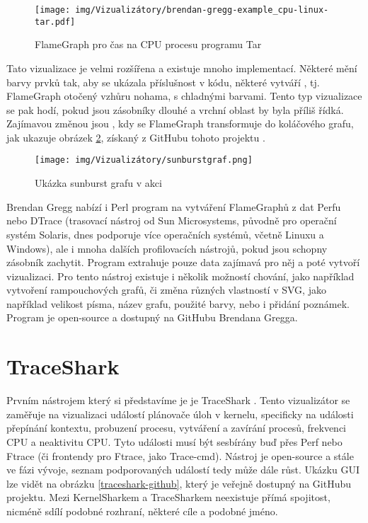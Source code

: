 \begin{figure}[p]\centering
    \texttt{[image: img/Vizualizátory/brendan-gregg-example\_cpu-linux-tar.pdf]}
    \caption{FlameGraph pro čas na CPU procesu programu Tar}
    \label{bg-flamegraf}
\end{figure}

Tato vizualizace je velmi rozšířena a existuje mnoho implementací. Některé mění barvy prvků tak, aby se ukázala příslušnost v kódu, některé vytváří , tj. FlameGraph otočený vzhůru nohama, s chladnými barvami. Tento typ vizualizace se pak hodí, pokud jsou zásobníky dlouhé a vrchní oblast by byla příliš řídká. Zajímavou změnou jsou , kdy se FlameGraph transformuje do koláčového grafu, jak ukazuje obrázek \ref{sunburstgraf}, získaný z GitHubu tohoto projektu \cite{SunburstGraphs}.

\begin{figure}[p]\centering
    \texttt{[image: img/Vizualizátory/sunburstgraf.png]}
    \caption{Ukázka sunburst grafu v akci}
    \label{sunburstgraf}
\end{figure}

Brendan Gregg nabízí i Perl program na vytváření FlameGraphů z dat Perfu nebo DTrace (trasovací nástroj od Sun Microsystems, původně pro operační systém Solaris, dnes podporuje více operačních systémů, včetně Linuxu a Windows), ale i mnoha dalších profilovacích nástrojů, pokud jsou schopny zásobník zachytit. Program extrahuje pouze data zajímavá pro něj a poté vytvoří vizualizaci. Pro tento nástroj existuje i několik možností chování, jako například vytvoření rampouchových grafů, či změna různých vlastností v SVG, jako například velikost písma, název grafu, použité barvy, nebo i přidání poznámek. Program je open-source a dostupný na GitHubu Brendana Gregga.

\section{TraceShark}

Prvním  nástrojem který si představíme je je TraceShark \cite{TraceShark}. Tento vizualizátor se zaměřuje na vizualizaci událostí plánovače úloh v kernelu, specificky na události přepínání kontextu, probuzení procesu, vytváření a zavírání procesů, frekvenci CPU a neaktivitu CPU. Tyto události musí být sesbírány buď přes Perf nebo Ftrace (či frontendy pro Ftrace, jako Trace-cmd). Nástroj je open-source a stále ve fázi vývoje, seznam podporovaných událostí tedy může dále růst. Ukázku GUI lze vidět na obrázku \ref{traceshark-github}, který je veřejně dostupný na GitHubu projektu. Mezi KernelSharkem a TraceSharkem neexistuje přímá spojitost, nicméně sdílí podobné rozhraní, některé cíle a podobné jméno.

